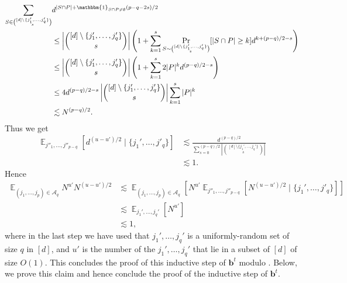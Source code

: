 \documentclass{article}
\newcommand{\1}{\mathbbm{1}}
\theoremstyle{plain}
\theoremstyle{definition}
\theoremstyle{remark}
\DeclareMathOperator*{\Eop}{\mathbb{E}}
\newcommand{\calA}{\mathcal{A}}
\newcommand{\bfb}{\boldsymbol{b}}
\begin{document}
\begin{align*}
    \sum_{S\in \binom{[d]\setminus \{j_1',\dots,j_q'\}}{s}}&  d^{|S\cap P| + \1_{S\cap P \neq \emptyset}(p-q-2s)/2} \\
    &\leq \left|\binom{[d]\setminus \{j_1',\dots,j_q'\}}{s}\right| \left(1+\sum_{k=1}^s \Pr_{S\sim \binom{[d]\setminus \{j_1',\dots,j_q'\}}{s}}[|S\cap P|\geq k] d^{k+ (p-q)/2- s} \right) \\
    &\leq \left|\binom{[d]\setminus \{j_1',\dots,j_q'\}}{s}\right| \left(1+\sum_{k=1}^s 2|P|^k d^{ (p-q)/2- s} \right) \\
    &\leq 4 d^{ (p-q)/2- s}\left|\binom{[d]\setminus \{j_1',\dots,j_q'\}}{s}\right| \sum_{k=1}^s |P|^k  \\
    &\lesssim   N^{ (p-q)/2}.
\end{align*}
Thus we get
\begin{align*}
    \Eop_{j''_1,\dots,j''_{p-q}}\left[d^{(u-u')/2}\; \Big|\;\{j_1',\dots,j'_q\}\right] &\lesssim \frac{d^{(p-q)/2}}{\sum_{s=0}^{(p-q)/2} |\binom{[d]\setminus \{j_1',\dots,j_q'\}}{s}| } \\
    &\lesssim 1.
\end{align*}
Hence 
\begin{align*}
    \Eop_{(j_1,\dots,j_p) \in \calA_q} N^{u'}N^{(u-u')/2} &\lesssim \Eop_{(j_1,\dots,j_p) \in \calA_q} \left[N^{u'}\Eop_{j''_1,\dots,j''_{p-q}}\left[N^{(u-u')/2}\; \Big|\;\{j_1',\dots,j'_q\}\right]\right] \\
    &\lesssim \Eop_{j_1',\dots,j_q'} \left[N^{u'}\right] \\
    &\lesssim 1,
\end{align*}
where in the last step we have used that $j_1',\dots,j_q'$ is a uniformly-random set of size $q$ in $[d]$, and $u'$ is the number of the $j_1',\dots,j_q'$ that lie in a subset of $[d]$ of size $ O(1).$ This concludes the proof of this inductive step of $\bfb^t$ modulo . Below, we prove this claim and hence conclude the proof of the inductive step of $\bfb^t$.
\end{document}
